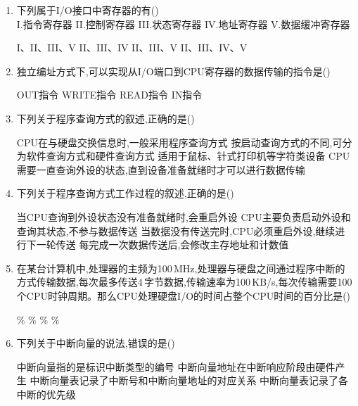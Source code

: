 \documentclass[12pt, a4paper, oneside, UTF8]{ctexbook}
\begin{document}
\begin{enumerate}
    \item 下列属于I/O接口中寄存器的有(\qquad)\\
    I.指令寄存器\quad
    II.控制寄存器\quad
    III.状态寄存器\quad
    IV.地址寄存器\quad
    V.数据缓冲寄存器
    \begin{choices}[2]
    \task I、II、III、V
    \task II、III、IV
    \task II、III、V
    \task II、III、IV、V
    \end{choices}

    \item 独立编址方式下,可以实现从I/O端口到CPU寄存器的数据传输的指令是(\qquad)
    \begin{choices}
    \task OUT指令
    \task WRITE指令
    \task READ指令
    \task IN指令
    \end{choices}

    \item 下列关于程序查询方式的叙述,正确的是(\qquad)
    \begin{choices}[1]
    \task CPU在与硬盘交换信息时,一般采用程序查询方式
    \task 按启动查询方式的不同,可分为软件查询方式和硬件查询方式
    \task 适用于鼠标、针式打印机等字符类设备
    \task CPU需要一直查询外设的状态,直到设备准备就绪时才可以进行数据传输
    \end{choices}

    \item 下列关于程序查询方式工作过程的叙述,正确的是(\qquad)
    \begin{choices}[1]
    \task 当CPU查询到外设状态没有准备就绪时,会重启外设
    \task CPU主要负责启动外设和查询其状态,不参与数据传送
    \task 当数据没有传送完时,CPU必须重启外设,继续进行下一轮传送
    \task 每完成一次数据传送后,会修改主存地址和计数值
    \end{choices}

    \item 在某台计算机中,处理器的主频为100\,MHz,处理器与硬盘之间通过程序中断的方式传输数据,每次最多传送4\,字节数据,传输速率为100\,KB/s,每次传输需要100个CPU时钟周期。那么CPU处理硬盘I/O的时间占整个CPU时间的百分比是(\qquad)
    \begin{choices}
    \%
    \%
    \%
    \%
    \end{choices}

    \item 下列关于中断向量的说法,错误的是(\qquad)
    \begin{choices}[1]
    \task 中断向量指的是标识中断类型的编号
    \task 中断向量地址在中断响应阶段由硬件产生
    \task 中断向量表记录了中断号和中断向量地址的对应关系
    \task 中断向量表记录了各中断的优先级
    \end{choices}


\end{enumerate}
\end{document}

